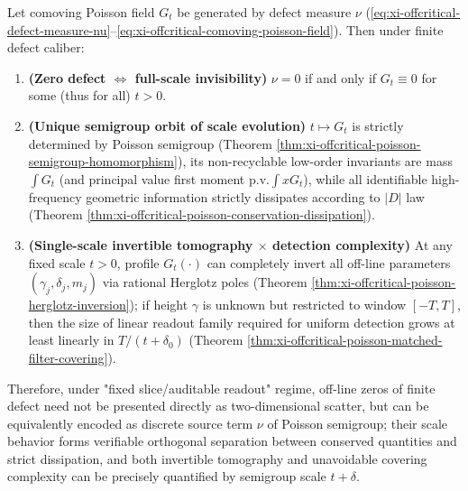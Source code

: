 \begin{corollary}\label{cor:xi-offcritical-poisson-field-classification}
Let comoving Poisson field \(G_t\) be generated by defect measure \(\nu\) (\eqref{eq:xi-offcritical-defect-measure-nu}--\eqref{eq:xi-offcritical-comoving-poisson-field}).
Then under finite defect caliber:
\begin{enumerate}
  \item \textbf{(Zero defect \(\Leftrightarrow\) full-scale invisibility)} \(\nu=0\) if and only if \(G_t\equiv 0\) for some (thus for all) \(t>0\).
  \item \textbf{(Unique semigroup orbit of scale evolution)} \(t\mapsto G_t\) is strictly determined by Poisson semigroup (Theorem \ref{thm:xi-offcritical-poisson-semigroup-homomorphism}), its non-recyclable low-order invariants are mass \(\int G_t\) (and principal value first moment \(\mathrm{p.v.}\int xG_t\)), while all identifiable high-frequency geometric information strictly dissipates according to \(|D|\) law (Theorem \ref{thm:xi-offcritical-poisson-conservation-dissipation}).
  \item \textbf{(Single-scale invertible tomography \(\times\) detection complexity)} At any fixed scale \(t>0\), profile \(G_t(\cdot)\) can completely invert all off-line parameters \((\gamma_j,\delta_j,m_j)\) via rational Herglotz poles (Theorem \ref{thm:xi-offcritical-poisson-herglotz-inversion}); if height \(\gamma\) is unknown but restricted to window \([-T,T]\), then the size of linear readout family required for uniform detection grows at least linearly in \(T/(t+\delta_0)\) (Theorem \ref{thm:xi-offcritical-poisson-matched-filter-covering}).
\end{enumerate}
Therefore, under "fixed slice/auditable readout" regime, off-line zeros of finite defect need not be presented directly as two-dimensional scatter, but can be equivalently encoded as discrete source term \(\nu\) of Poisson semigroup; their scale behavior forms verifiable orthogonal separation between conserved quantities and strict dissipation, and both invertible tomography and unavoidable covering complexity can be precisely quantified by semigroup scale \(t+\delta\).
\end{corollary}

